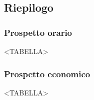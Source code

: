 \subsection{Riepilogo}

\subsubsection{Prospetto orario}

<TABELLA>

\subsubsection{Prospetto economico}

<TABELLA>


